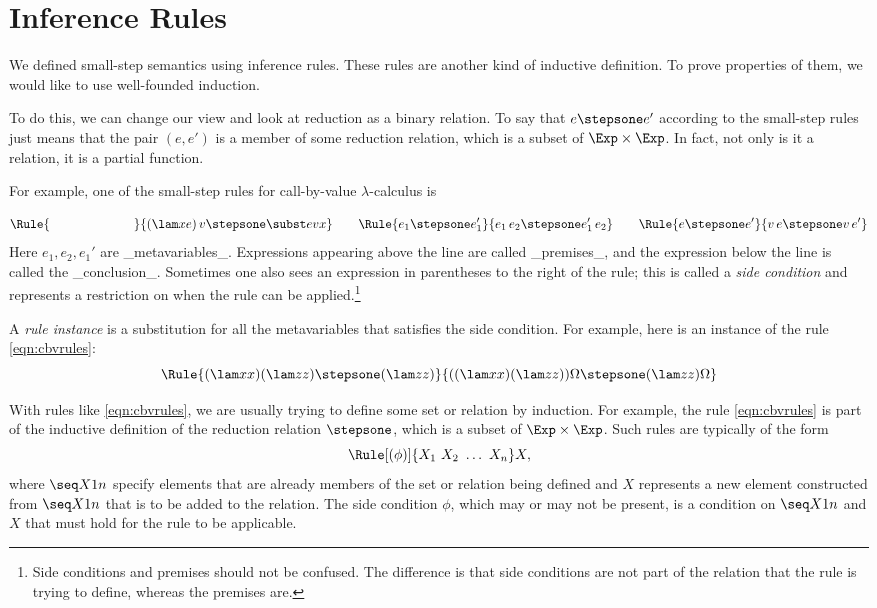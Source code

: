 \section{Inference Rules}

We defined small-step semantics using inference rules. These rules are another kind of inductive definition. To prove properties of them, we would like to use well-founded induction.

To do this, we can change our view and look at reduction as a binary relation. To say that $e \stepsone e'$ according to the small-step rules just means that the pair $(e,e')$ is a member of some reduction relation, which is a subset of $\Exp \times \Exp$. In fact, not only is it a relation, it is a partial function.

For example, one of the small-step rules for call-by-value $\lambda$-calculus is

\begin{equation}
\Rule{\phantom{e_1 \stepsone e'_1}}{(\lam xe)\,v \stepsone \subst evx}
\qquad
\Rule{e_1 \stepsone e'_1}{e_1\,e_2 \stepsone e'_1\,e_2}
\qquad
\Rule{e \stepsone e'}{ v\,e \stepsone v\,e'}
\label{eqn:cbvrules}
\end{equation}
Here $e_1,e_2,e_1'$ are _metavariables_. Expressions appearing above the line are called _premises_, and the expression below the line is called the _conclusion_. Sometimes one also sees an expression in parentheses to the right of the rule; this is called a \emph{side condition} and represents a restriction on when the rule can be applied.\footnote{Side conditions and premises should not be confused. The difference is that side conditions are not part of the relation that the rule is trying to define, whereas the premises are.}

A \emph{rule instance} is a substitution for all the metavariables that satisfies the side condition. For example, here is an instance of the rule \eqref{eqn:cbvrules}:
\[
\Rule
{ (\lam x x) (\lam z z) \stepsone (\lam z z) }
{ ((\lam x x) (\lam z z)) \Omega \stepsone (\lam z z) \Omega }
\]

With rules like \eqref{eqn:cbvrules}, we are usually trying to define some set or relation by induction. For example, the rule \eqref{eqn:cbvrules} is part of the inductive definition of the reduction relation $\stepsone$, which is a subset of $\Exp \times \Exp$. Such rules are typically of the form
\begin{equation}
\Rule
[(\phi)]
{X_1\ X_2\ \ldots\ X_n}
X ,
\label{eqn:examplerule2}
\end{equation}
where $\seq X1n$ specify elements that are already members of the set or relation being defined and $X$ represents a new element constructed from $\seq X1n$ that is to be added to the relation. The side condition $\phi$, which may or may not be present, is a condition on $\seq X1n$ and $X$ that must hold for the rule to be applicable.

